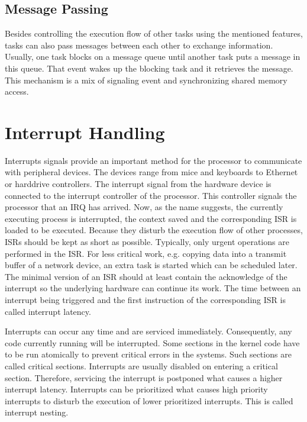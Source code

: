 \subsection{Message Passing}
Besides controlling the execution flow of other tasks using the mentioned features, tasks can also pass messages between each other to exchange information. 
Usually, one task blocks on a message queue until another task puts a message in this queue.
That event wakes up the blocking task and it retrieves the message.
This mechanism is a mix of signaling event and synchronizing shared memory access.

\section{Interrupt Handling}\label{s_interrupt_handling}
Interrupts signals provide an important method for the processor to communicate with peripheral devices.
The devices range from mice and keyboards to Ethernet or harddrive controllers.
The interrupt signal from the hardware device is connected to the interrupt controller of the processor. 
This controller signals the processor that an \ac{IRQ} has arrived.
Now, as the name suggests, the currently executing process is interrupted, the context saved and the corresponding \ac{ISR} is loaded to be executed.
Because they disturb the execution flow of other processes, \acp{ISR} should be kept as short as possible.
Typically, only urgent operations are performed in the \ac{ISR}. 
For less critical work, e.g. copying data into a transmit buffer of a network device, an extra task is started which can be scheduled later.
The minimal version of an \ac{ISR} should at least contain the acknowledge of the interrupt so the underlying hardware can continue its work.
The time between an interrupt being triggered and the first instruction of the corresponding \ac{ISR} is called interrupt latency.
\par
Interrupts can occur any time and are serviced immediately.
Consequently, any code currently running will be interrupted.
Some sections in the kernel code have to be run atomically to prevent critical errors in the systems.
Such sections are called critical sections.
Interrupts are usually disabled on entering a critical section.
Therefore, servicing the interrupt is postponed what causes a higher interrupt latency.
Interrupts can be prioritized what causes high priority interrupts to disturb the execution of lower prioritized interrupts.
This is called interrupt nesting.
 
